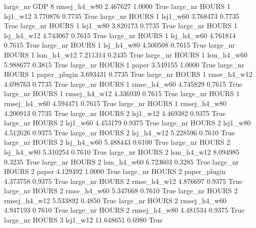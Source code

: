   large_nr      GDP                 8 rmsej_h4_w80    2.467627      1.0000    True
  large_nr    HOURS                 1     lsj1_w12    3.770876      0.7735    True
  large_nr    HOURS                 1     lsj1_w60    3.768473      0.7735    True
  large_nr    HOURS                 1     lsj1_w80    3.820173      0.7735    True
  large_nr    HOURS                 1   lsj_h4_w12    4.743067      0.7615    True
  large_nr    HOURS                 1   lsj_h4_w60    4.761814      0.7615    True
  large_nr    HOURS                 1   lsj_h4_w80    4.500508      0.7615    True
  large_nr    HOURS                 1   lsm_h4_w12    7.211314      0.2435    True
  large_nr    HOURS                 1   lsm_h4_w60    5.988677      0.3815    True
  large_nr    HOURS                 1        paper    3.549155      1.0000    True
  large_nr    HOURS                 1 paper_plugin    3.693431      0.7735    True
  large_nr    HOURS                 1  rmse_h4_w12    4.698763      0.7735    True
  large_nr    HOURS                 1  rmse_h4_w60    4.745829      0.7615    True
  large_nr    HOURS                 1 rmsej_h4_w12    4.336939      0.7615    True
  large_nr    HOURS                 1 rmsej_h4_w60    4.594471      0.7615    True
  large_nr    HOURS                 1 rmsej_h4_w80    4.200913      0.7735    True
  large_nr    HOURS                 2     lsj1_w12    4.469382      0.9375    True
  large_nr    HOURS                 2     lsj1_w60    4.453179      0.9375    True
  large_nr    HOURS                 2     lsj1_w80    4.512626      0.9375    True
  large_nr    HOURS                 2   lsj_h4_w12    5.228596      0.7610    True
  large_nr    HOURS                 2   lsj_h4_w60    5.488443      0.6100    True
  large_nr    HOURS                 2   lsj_h4_w80    5.310254      0.7610    True
  large_nr    HOURS                 2   lsm_h4_w12    8.094985      0.3235    True
  large_nr    HOURS                 2   lsm_h4_w60    6.723603      0.3285    True
  large_nr    HOURS                 2        paper    4.129492      1.0000    True
  large_nr    HOURS                 2 paper_plugin    4.373758      0.9375    True
  large_nr    HOURS                 2  rmse_h4_w12    4.876697      0.9375    True
  large_nr    HOURS                 2  rmse_h4_w60    5.347668      0.7610    True
  large_nr    HOURS                 2 rmsej_h4_w12    5.533892      0.4850    True
  large_nr    HOURS                 2 rmsej_h4_w60    4.947193      0.7610    True
  large_nr    HOURS                 2 rmsej_h4_w80    4.481534      0.9375    True
  large_nr    HOURS                 3     lsj1_w12   11.648651      0.6980    True
